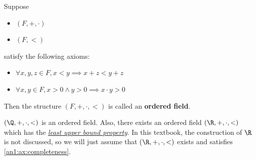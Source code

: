 \begin{definition} \label{an1:def:ordered-field}
  Suppose
  \begin{itemize}
    \item $(F, +, \cdot)$
    \item $(F, <)$
  \end{itemize}
  satisfy the following axioms:
  \begin{itemize}
    \item $\forall x, y, z \in F, x < y \implies x + z < y + z$
    \item $\forall x, y \in F, x > 0 \land y > 0 \implies x \cdot y > 0$
  \end{itemize}
  Then the structure $(F, +, \cdot, <)$ is called an \textbf{ordered field}.
\end{definition}

\begin{remark}
  $(\Q, +, \cdot, <)$ is an ordered field. Also, there exists an ordered field $(\R, +, \cdot, <)$
  which has the \hyperref[an1:def:least-upper-bound-property]{\emph{least upper bound property}}.
  In this textbook, the construction of $\R$ is not discussed, so we will just assume that
  $(\R, +, \cdot, <)$ exists and satisfies \cref{an1:ax:completeness}.
\end{remark}
